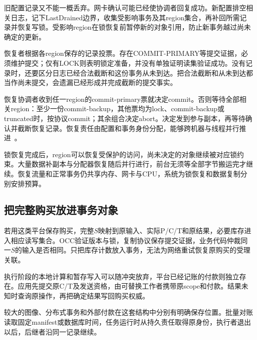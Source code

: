 
旧配置记录又不能一概丢弃。网卡确认可能已经使协调者回复成功。新配置排空相关日志，记下LastDrained边界，收集受影响事务及其region集合，再补回所需记录并恢复写锁。受影响region在锁恢复前暂停新的对象引用，防止新事务越过尚未确定的更新。

恢复者根据各region保存的记录投票。存在COMMIT-PRIMARY等提交证据，必须维护提交；仅有LOCK则表明锁定准备，并没有单独证明读集验证成功。没有记录时，还要区分日志已经合法截断和这份事务从未到达。把合法截断和从未到达都当作尚未提交，会遗漏已经形成并完成截断的提交事实。


恢复协调者收到任一region的commit-primary票就决定commit。否则等待全部相关region：至少一份commit-backup，其他票均为lock、commit-backup或truncated时，按协议commit；其余组合决定abort。决定发到参与副本，再等待确认并截断恢复记录。恢复责任由配置和事务身份分配，能够跨机器与线程并行推进~\cite{farm2015}。

锁恢复完成后，region可以恢复受保护的访问，尚未决定的对象继续被对应锁约束。大量数据补副本与分配器恢复随后并行进行，前台无须等全部字节搬运完才继续。恢复流量和正常事务仍共享内存、网卡与CPU，系统为锁恢复和数据复制分别安排预算。

\subsection{把完整购买放进事务对象}

若用这类平台保存购买，完整$S$映射到原输入、实际P/C/T和原结果，必要库存进入相应读写集合。OCC验证版本与锁，复制协议保存提交证据，业务代码仲裁同一$S$的输入是否相同。只把库存计数放入事务，无法为网络重试恢复原购买的受理关联。

执行阶段的本地计算和暂存写入可以随冲突放弃，平台已经记账的付款则独立存在。应用先提交原C/T及发送资格，由可替换工作者携带原scope和付款。结果未知时查询原操作，再把确定结果写回购买权威。

较大的图像、分布式事务和外部付款在这套结构中分别有明确保存位置。批量对账读取固定manifest或数据库时间，任务运行时从持久责任取得原身份，执行者退出以后，后继者沿同一记录继续。
\FloatBarrier
